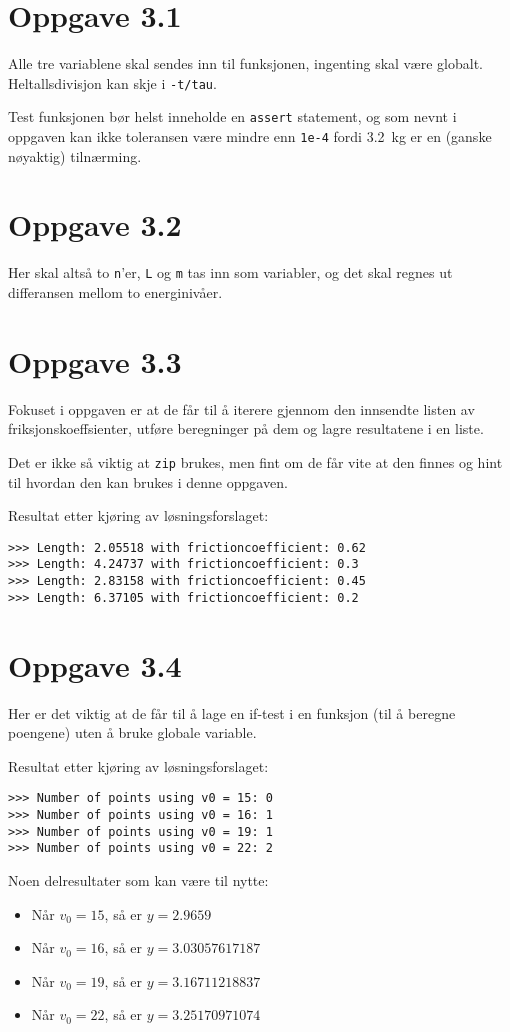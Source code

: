 \documentclass[10pt,a4paper]{article}
\begin{document}
\section*{Oppgave 3.1}
Alle tre variablene skal sendes inn til funksjonen, ingenting skal være globalt. Heltallsdivisjon kan skje i \texttt{-t/tau}.

Test funksjonen bør helst inneholde en \texttt{assert} statement, og som nevnt i oppgaven kan ikke toleransen være mindre enn \texttt{1e-4} fordi \SI{3.2}{kg} er en (ganske nøyaktig) tilnærming.




\section*{Oppgave 3.2}
Her skal altså to \texttt{n}'er, \texttt{L} og \texttt{m} tas inn som variabler, og det skal regnes ut differansen mellom to energinivåer. 




\section*{Oppgave 3.3}
Fokuset i oppgaven er at de får til å iterere gjennom den innsendte listen av friksjonskoeffsienter, utføre beregninger på dem og lagre resultatene i en liste. 

Det er ikke så viktig at \texttt{zip} brukes, men fint om de får vite at den finnes og hint til hvordan den kan brukes i denne oppgaven. 

\newpage
Resultat etter kjøring av løsningsforslaget:
\begin{verbatim}
>>> Length: 2.05518 with frictioncoefficient: 0.62 
>>> Length: 4.24737 with frictioncoefficient: 0.3 
>>> Length: 2.83158 with frictioncoefficient: 0.45 
>>> Length: 6.37105 with frictioncoefficient: 0.2
\end{verbatim}



\section*{Oppgave 3.4}
Her er det viktig at de får til å lage en if-test i en funksjon (til å beregne poengene) uten å bruke globale variable. 
 
 Resultat etter kjøring av løsningsforslaget:
 \begin{verbatim}
>>> Number of points using v0 = 15: 0
>>> Number of points using v0 = 16: 1
>>> Number of points using v0 = 19: 1
>>> Number of points using v0 = 22: 2
 \end{verbatim}
 Noen delresultater som kan være til nytte:
 \begin{itemize}
 	\item Når $v_0 = 15$, så er $y = 2.9659$
 	\item Når $v_0 = 16$, så er $y = 3.03057617187$
 	\item Når $v_0 = 19$, så er $y = 3.16711218837$
 	\item Når $v_0 = 22$, så er $y = 3.25170971074$
 \end{itemize}
\end{document}
